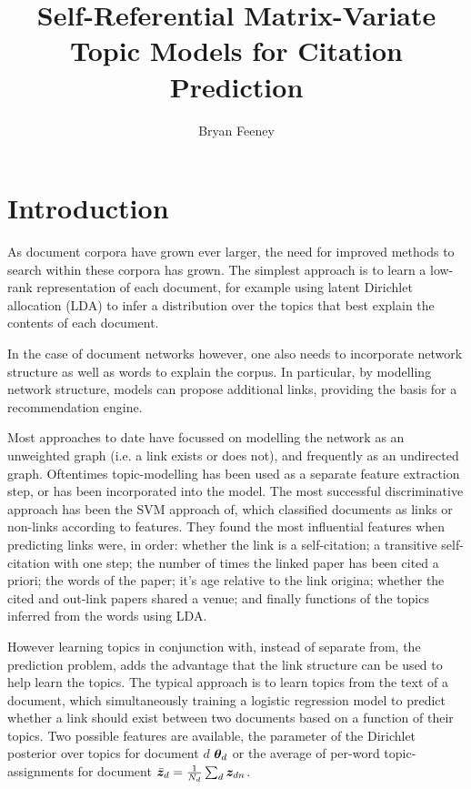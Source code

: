 

\newcommand \thdo { { \vv{\theta}_{d\cdot} } }
\newcommand \thok { { \vv{\theta}_{\cdot k} } }
\newcommand \phok { { \vv{\phi}_{\cdot k} } }
\newcommand \phdo { { \vv{\phi}_{d\cdot} } }

\title{Self-Referential Matrix-Variate Topic Models for Citation Prediction}
\author{Bryan Feeney}
\maketitle
\section{Introduction}
As document corpora have grown ever larger, the need for improved methods to search within these corpora has grown. The simplest approach is to learn a low-rank representation of each document, for example using latent Dirichlet allocation (LDA)\cite{BleiNgJordan2003} to infer a distribution over the topics that best explain the contents of each document. 

In the case of document networks however, one also needs to incorporate network structure as well as words to explain the corpus. In particular, by modelling network structure, models can propose additional links, providing the basis for a recommendation engine. 

Most approaches to date have focussed on modelling the network as an unweighted graph (i.e. a link exists or does not), and frequently as an undirected graph. Oftentimes topic-modelling has been used as a separate feature extraction step, or has been incorporated into the model. The most successful discriminative approach has been the SVM approach of\cite{Bethard2010}, which classified documents as links or non-links according to features. They found the most influential features when predicting links were, in order: whether the link is a self-citation; a transitive self-citation with one step; the number of times the linked paper has been cited a priori; the words of the paper; it's age relative to the link origina; whether the cited and out-link papers shared a venue; and finally functions of the topics inferred from the words using LDA\cite{Blei2003}.

However learning topics in conjunction with, instead of separate from, the prediction problem, adds the advantage that the link structure can be used to help learn the topics. The typical approach is to learn topics from the text of a document, which simultaneously training a logistic regression model to predict whether a link should exist between two documents based on a function of their topics. Two possible features are available, the parameter of the Dirichlet posterior over topics for document $d$ ${ \bm \theta_d }$ or the average of per-word topic-assignments for document $\bar{\bm z}_d = \frac{1}{N_d} \sum_d \bm z_{dn}$.


